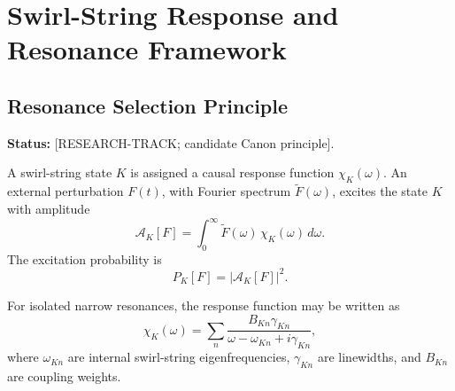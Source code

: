 
\providecommand{\vswirl}{\mathbf{v}_{\!\boldsymbol{\circlearrowleft}}}
\providecommand{\vnorm}{\lVert \mathbf{v}_{\!\boldsymbol{\circlearrowleft}}\rVert}
\providecommand{\rhoF}{\rho_{\!f}}
\providecommand{\rhoE}{\rho_{\!E}}
\providecommand{\rhoM}{\rho_{\!m}}
\providecommand{\rhocore}{\rho_{\text{core}}}
\providecommand{\rc}{r_c}
\providecommand{\omC}{\omega_C}
\providecommand{\Fswirlmax}{F_{\text{swirl}}^{\max}}


\section{Swirl-String Response and Resonance Framework}

\subsection{Resonance Selection Principle}
    \label{sec:resonance-selection-principle}
    
    \noindent
    \textbf{Status:} [RESEARCH-TRACK; candidate Canon principle].
    
    A swirl-string state \(K\) is assigned a causal response function
    \(\chi_K(\omega)\). An external perturbation \(F(t)\), with Fourier
    spectrum \(\widetilde F(\omega)\), excites the state \(K\) with amplitude
    \begin{equation}
        \mathcal A_K[F]
        =
        \int_0^\infty
        \widetilde F(\omega)\,
        \chi_K(\omega)\,
        d\omega .
    \end{equation}
    The excitation probability is
    \begin{equation}
        P_K[F]
        =
        |\mathcal A_K[F]|^2 .
    \end{equation}
    
    For isolated narrow resonances, the response function may be written as
    \begin{equation}
        \chi_K(\omega)
        =
        \sum_n
        \frac{B_{Kn}\gamma_{Kn}}
        {\omega-\omega_{Kn}+i\gamma_{Kn}},
    \end{equation}
    where \(\omega_{Kn}\) are internal swirl-string eigenfrequencies,
    \(\gamma_{Kn}\) are linewidths, and \(B_{Kn}\) are coupling weights.
    
